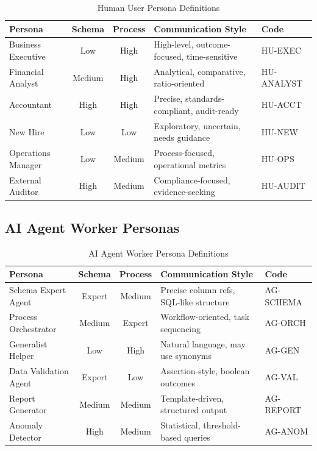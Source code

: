 \begin{table}[htbp]
\centering
\footnotesize
\caption{Human User Persona Definitions}
\label{tab:human-personas}
\begin{tabularx}{\textwidth}{@{}l c c X l@{}}
\toprule
\textbf{Persona} & \textbf{Schema} & \textbf{Process} & \textbf{Communication Style} & \textbf{Code} \\
\midrule
Business Executive & Low & High & High-level, outcome-focused, time-sensitive & HU-EXEC \\
Financial Analyst & Medium & High & Analytical, comparative, ratio-oriented & HU-ANALYST \\
Accountant & High & High & Precise, standards-compliant, audit-ready & HU-ACCT \\
New Hire & Low & Low & Exploratory, uncertain, needs guidance & HU-NEW \\
Operations Manager & Low & Medium & Process-focused, operational metrics & HU-OPS \\
External Auditor & High & Medium & Compliance-focused, evidence-seeking & HU-AUDIT \\
\bottomrule
\end{tabularx}
\end{table}

\subsection{AI Agent Worker Personas}

\begin{table}[htbp]
\centering
\footnotesize
\caption{AI Agent Worker Persona Definitions}
\label{tab:agent-personas}
\begin{tabularx}{\textwidth}{@{}l c c X l@{}}
\toprule
\textbf{Persona} & \textbf{Schema} & \textbf{Process} & \textbf{Communication Style} & \textbf{Code} \\
\midrule
Schema Expert Agent & Expert & Medium & Precise column refs, SQL-like structure & AG-SCHEMA \\
Process Orchestrator & Medium & Expert & Workflow-oriented, task sequencing & AG-ORCH \\
Generalist Helper & Low & High & Natural language, may use synonyms & AG-GEN \\
Data Validation Agent & Expert & Low & Assertion-style, boolean outcomes & AG-VAL \\
Report Generator & Medium & Medium & Template-driven, structured output & AG-REPORT \\
Anomaly Detector & High & Medium & Statistical, threshold-based queries & AG-ANOM \\
\bottomrule
\end{tabularx}
\end{table}

